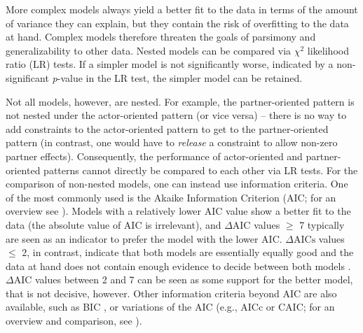 \documentclass[jou,a4paper,draftfirst]{apa6}
\begin{document}
More complex models always yield a better fit to the data in terms of the amount of variance they can explain, but they contain the risk of overfitting to the data at hand. Complex models therefore threaten the goals of parsimony and generalizability to other data. Nested models can be compared via $\chi^2$ likelihood ratio (LR) tests. If a simpler model is not significantly worse, indicated by a non-significant \emph{p}-value in the LR test, the simpler model can be retained.
 
Not all models, however, are nested. For example, the partner-oriented pattern is not nested under the actor-oriented pattern (or vice versa) -- there is no way to add constraints to the actor-oriented pattern to get to the partner-oriented pattern (in contrast, one would have to \textit{release} a constraint to allow non-zero partner effects). Consequently, the performance of actor-oriented and partner-oriented patterns cannot directly be compared to each other via LR tests. For the comparison of non-nested models, one can instead use information criteria. One of the most commonly used is the Akaike Information Criterion (AIC; for an overview see ). Models with a relatively lower AIC value show a better fit to the data (the absolute value of AIC is irrelevant), and $\Delta \text{AIC}$ values $\geq$ 7 typically are seen as an indicator to prefer the model with the lower AIC. $\Delta \text{AICs}$ values $\leq$ 2, in contrast, indicate that both models are essentially equally good and the data at hand does not contain enough evidence to decide between both models \parencite{burnham_aic_2011,symonds_brief_2011}. $\Delta \text{AIC}$ values between 2 and 7 can be seen as some support for the better model, that is not decisive, however. Other information criteria beyond AIC are also available, such as BIC \parencite{Burnham_Anderson_2004}, or variations of the AIC (e.g., AICc or CAIC; for an overview and comparison, see ).
\end{document}
